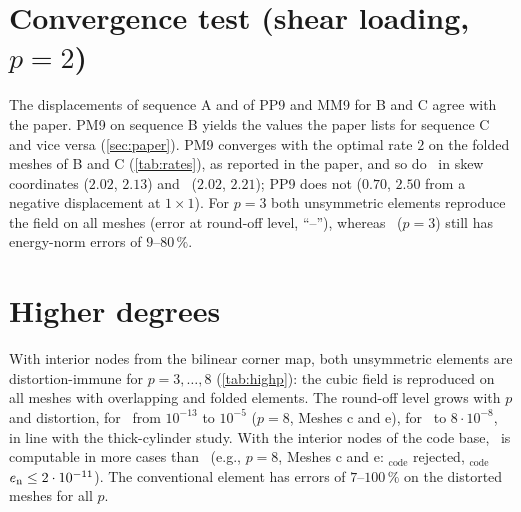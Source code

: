 \documentclass[10pt,a4paper]{article}
\begin{document}
\section{Convergence test (shear loading, $p=2$)}\label{sec:conv}
\begin{table}[h]
  \centering\small
  \caption{$u_y(A)$ for the sequences A, B, C (paper: Tables~17--19; exact $3.3125$). $^\ast$
    after a paper value: differs from the present result, see \cref{sec:paper}.}
  \label{tab:conv}
  \resizebox{\linewidth}{!}{}

  \vspace{3mm}
  \caption{Least-squares rates of the energy-norm strain error, Eq.~(24) of the paper (paper:
    Fig.~15). PP9 ($p=2$) and \PP\ ($p=3$) on folded meshes: the parametric strain is singular
    where $\det(\bm J)=0$, so the energy error of PP9 and \PP\ is not well defined for B and C
    (here: signed $\det(\bm J)$).
    ``--'': error at round-off level (field reproduced).}
  \label{tab:rates}
  
\end{table}
The displacements of sequence A and of PP9 and MM9 for B and C agree with the paper. PM9 on
sequence B yields the values the paper lists for sequence C and vice versa (\cref{sec:paper}).
PM9 converges with the optimal rate $2$ on the folded meshes of B and C (\cref{tab:rates}), as reported in the paper,
and so do \PM\ in skew coordinates ($2.02$, $2.13$) and \PH\ ($2.02$, $2.21$); PP9 does not ($0.70$,
$2.50$ from a negative displacement at $1\times1$). For $p=3$ both unsymmetric elements reproduce
the field on all meshes (error at round-off level, ``--''), whereas \PP\ ($p=3$) still has
energy-norm errors of $9$--$80\,\%$.

\section{Higher degrees}\label{sec:highp}
\begin{table}[h]
  \centering\small
  \caption{Shear loading on Meshes a--f: relative nodal error $\en$ for $p=3,\dots,8$ (cubic
    field, contained in the \PM\ trial space for $p\ge3$). \PM: interior nodes from the bilinear
    corner map; \PM$_\mathrm{code}$: interior nodes of \texttt{pSpectralElement\_NodesTopology};
    ``err.'': the code base stops (coincident nodes or singular metric interpolation).}
  \label{tab:highp}
  
\end{table}
With interior nodes from the bilinear corner map, both unsymmetric elements are
distortion-immune for $p=3,\dots,8$ (\cref{tab:highp}): the cubic field is reproduced on
all meshes with overlapping and folded elements. The round-off level grows with $p$ and
distortion, for \PM\ from $10^{-13}$ to $10^{-5}$ ($p=8$, Meshes c and e), for \PH\ to $8\cdot10^{-8}$,
in line with the thick-cylinder study. With the interior nodes of the code base, \PH\ is
computable in more cases than \PM\ (e.g., $p=8$, Meshes c and e: \PM$_\mathrm{code}$ rejected,
\PH$_\mathrm{code}$ $e_{\mathrm{n}}\le2\cdot10^{-11}$). The conventional element has errors of $7$--$100\,\%$ on
the distorted meshes for all $p$.
\end{document}
